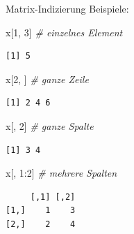 \documentclass[
  10pt,
  ignorenonframetext,
  aspectratio=169,
]{beamer}
\newenvironment{Shaded}{}{}
\newcommand{\CommentTok}[1]{\textcolor[rgb]{0.38,0.63,0.69}{\textit{#1}}}
\newcommand{\DecValTok}[1]{\textcolor[rgb]{0.25,0.63,0.44}{#1}}
\newcommand{\NormalTok}[1]{#1}
\newcommand{\SpecialCharTok}[1]{\textcolor[rgb]{0.25,0.44,0.63}{#1}}
\begin{document}
\begin{frame}[fragile]{Matrix-Indizierung}
\label{matrix-indizierung-1}
Beispiele:

\begin{Shaded}
\begin{Highlighting}[]
\NormalTok{x[}\DecValTok{1}\NormalTok{, }\DecValTok{3}\NormalTok{]    }\CommentTok{\# einzelnes Element}
\end{Highlighting}
\end{Shaded}

\begin{verbatim}
[1] 5
\end{verbatim}

\begin{Shaded}
\begin{Highlighting}[]
\NormalTok{x[}\DecValTok{2}\NormalTok{, ]     }\CommentTok{\# ganze Zeile}
\end{Highlighting}
\end{Shaded}

\begin{verbatim}
[1] 2 4 6
\end{verbatim}

\begin{Shaded}
\begin{Highlighting}[]
\NormalTok{x[, }\DecValTok{2}\NormalTok{]     }\CommentTok{\# ganze Spalte}
\end{Highlighting}
\end{Shaded}

\begin{verbatim}
[1] 3 4
\end{verbatim}

\begin{Shaded}
\begin{Highlighting}[]
\NormalTok{x[, }\DecValTok{1}\SpecialCharTok{:}\DecValTok{2}\NormalTok{]   }\CommentTok{\# mehrere Spalten}
\end{Highlighting}
\end{Shaded}

\begin{verbatim}
     [,1] [,2]
[1,]    1    3
[2,]    2    4
\end{verbatim}
\end{frame}
\end{document}
